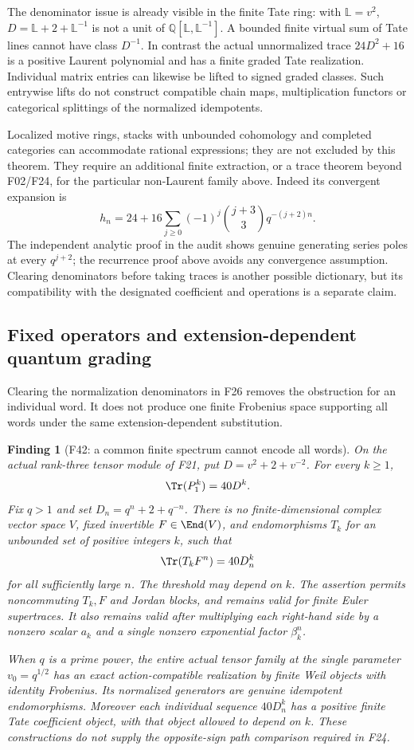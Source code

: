 \documentclass[11pt,a4paper]{article}
\newcommand{\Q}{\mathbb Q}\newcommand{\Z}{\mathbb Z}\newcommand{\C}{\mathbb C}\newcommand{\N}{\mathbb N}\newcommand{\F}{\mathbb F}
\newcommand{\fid}[1]{\textsf{#1}}\newcommand{\gate}[1]{\textsf{#1}}
\theoremstyle{named}\newtheorem{finding}{Finding}[section]
\theoremstyle{definition}\newtheorem{definition}[finding]{Definition}
\theoremstyle{remark}\newtheorem{remark}[finding]{Remark}
\begin{document}
The denominator issue is already visible in the finite Tate ring:
with $\mathbb L=v^2$, $D=\mathbb L+2+\mathbb L^{-1}$ is not a unit
of $\Q[\mathbb L,\mathbb L^{-1}]$. A bounded finite virtual sum of
Tate lines cannot have class $D^{-1}$. In contrast the actual
unnormalized trace $24D^2+16$ is a positive Laurent polynomial and
has a finite graded Tate realization. Individual matrix entries can
likewise be lifted to signed graded classes. Such entrywise lifts do
not construct compatible chain maps, multiplication functors or
categorical splittings of the normalized idempotents.

Localized motive rings, stacks with unbounded cohomology and completed
categories can accommodate rational expressions; they are not excluded
by this theorem. They require an additional finite extraction, or a
trace theorem beyond \fid{F02}/\fid{F24}, for the particular non-Laurent
family above. Indeed its convergent expansion is
\[
 h_n=24+16\sum_{j\ge0}(-1)^j\binom{j+3}{3}q^{-(j+2)n}.
\]
The independent analytic proof in the audit shows genuine generating
series poles at every $q^{j+2}$; the recurrence proof above avoids any
convergence assumption. Clearing denominators before taking traces is
another possible dictionary, but its compatibility with the designated
coefficient and operations is a separate claim.


\subsection{Fixed operators and extension-dependent quantum grading}
Clearing the normalization denominators in \fid{F26} removes
the obstruction for an individual word. It does not produce
one finite Frobenius space supporting all words under the same
extension-dependent substitution.

\begin{finding}[\fid{F42}: a common finite spectrum cannot encode all words]\label{f:commonwords}
On the actual rank-three tensor module of \fid{F21}, put
$D=v^2+2+v^{-2}$. For every $k\ge1$,
\[
 \Tr(P_1^k)=40D^k.
\]
Fix $q>1$ and set $D_n=q^n+2+q^{-n}$.
There is no finite-dimensional complex vector space $V$,
fixed invertible $F\in\End(V)$, and endomorphisms $T_k$ for
an unbounded set of positive integers $k$, such that
\[
 \Tr(T_kF^n)=40D_n^k
\]
for all sufficiently large $n$. The threshold may depend on $k$.
The assertion permits noncommuting $T_k,F$ and Jordan blocks,
and remains valid for finite Euler supertraces. It also remains
valid after multiplying each right-hand side by a nonzero scalar
$a_k$ and a single nonzero exponential factor $\beta_k^n$.

When $q$ is a prime power, the entire actual tensor family at the single
parameter $v_0=q^{1/2}$ has an exact action-compatible realization
by finite Weil objects with identity Frobenius. Its normalized
generators are genuine idempotent endomorphisms. Moreover each
individual sequence $40D_n^k$ has a positive finite Tate
coefficient object, with that object allowed to depend on $k$.
These constructions do not supply the opposite-sign path
comparison required in \fid{F24}.
\end{finding}
\end{document}
